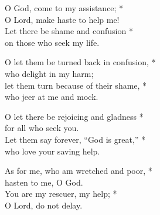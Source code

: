 O God, come to my assistance; *\\
O Lord, make haste to help me! \\
Let there be shame and confusion *\\
on those who seek my life. 

O let them be turned back in confusion, *\\
who delight in my harm; \\
let them turn because of their shame, *\\
who jeer at me and mock. 

O let there be rejoicing and gladness *\\
for all who seek you. \\
Let them say forever, “God is great,” *\\
who love your saving help. 

As for me, who am wretched and poor, *\\
hasten to me, O God. \\
You are my rescuer, my help; *\\
O Lord, do not delay. 
